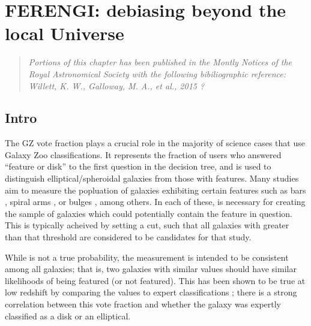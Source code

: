 



\chapter{FERENGI: debiasing beyond the local Universe}
\label{chap:ferengi}
\begin{quote}
\emph{ Portions of this chapter has been published in the Montly Notices of the Royal Astronomical Society with the following bibiliographic reference:  Willett, K. W., Galloway, M. A., et al., 2015 ?}\\
\end{quote}
\section{Intro}
\label{sec:ferengi_Intro}

The GZ vote fraction \ffeatures{} plays a crucial role in the majority of science cases that use Galaxy Zoo classifications. It represents the fraction of users who answered ``feature or disk'' to the first question in the decision tree, and is used to distinguish elliptical/spheroidal galaxies from those with features. Many studies aim to measure the popluation of galaxies exhibiting certain features such as bars \citep{Masters2010,Masters2012,Melvin2014,Simmons2014,Cheung2015,Kruk2017}, spiral arms \citep{Willett2015,Hart2017}, or bulges \citep{Skibba2012,Simmons2012}, among others. In each of these, \ffeatures{} is necessary for creating the sample of galaxies which could potentially contain the feature in question. This is typically acheived by setting a cut, such that all galaxies with \ffeatures{} greater than that threshold are considered to be candidates for that study.

While \ffeatures{} is not a true probability, the measurement is intended to be consistent among all galaxies; that is, two galaxies with similar \ffeatures{} values should have similar likelihoods of being featured (or not featured). This has been shown to be true at low redshift by comparing the \ffeatures values to expert classifications \citep{Willett2013}; there is a strong correlation between this vote fraction and whether the galaxy was expertly classified as a disk or an elliptical.    

